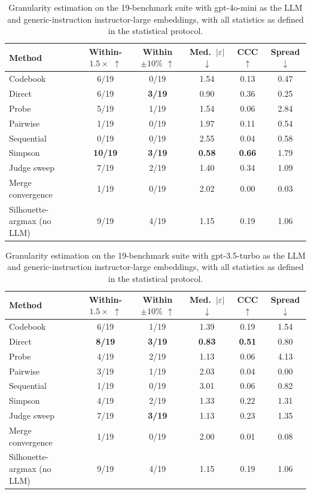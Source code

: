 \documentclass[11pt,a4paper,oneside]{report}
\begin{document}
\begin{table}[htbp]
\centering
\small
\begin{tabular}{lccccc}
\toprule
Method & Within-$1.5\times$ $\uparrow$ & Within $\pm10\%$ $\uparrow$ & Med.\ $|\varepsilon|$ $\downarrow$ & CCC $\uparrow$ & Spread $\downarrow$ \\
\midrule
Codebook & 6/19 & 0/19 & 1.54 & 0.13 & 0.47 \\
Direct & 6/19 & \textbf{3/19} & 0.90 & 0.36 & 0.25 \\
Probe & 5/19 & 1/19 & 1.54 & 0.06 & 2.84 \\
Pairwise & 1/19 & 0/19 & 1.97 & 0.11 & 0.54 \\
Sequential & 0/19 & 0/19 & 2.55 & 0.04 & 0.58 \\
Simpson & \textbf{10/19} & \textbf{3/19} & \textbf{0.58} & \textbf{0.66} & 1.79 \\
Judge sweep & 7/19 & 2/19 & 1.40 & 0.34 & 1.09 \\
Merge convergence & 1/19 & 0/19 & 2.02 & 0.00 & 0.03 \\
\midrule
Silhouette-argmax (no LLM) & 9/19 & 4/19 & 1.15 & 0.19 & 1.06 \\
\bottomrule
\end{tabular}
\caption[Granularity estimation scoreboard, gpt-4o-mini]{Granularity estimation on the
19-benchmark suite with {\small\ttfamily gpt-4o-mini} as the LLM and
generic-instruction {\small\ttfamily instructor-large} embeddings, with all
statistics as defined in the statistical protocol.}
\label{tab:rq2-scoreboard-gpt4omini}
\end{table}

\begin{table}[htbp]
\centering
\small
\begin{tabular}{lccccc}
\toprule
Method & Within-$1.5\times$ $\uparrow$ & Within $\pm10\%$ $\uparrow$ & Med.\ $|\varepsilon|$ $\downarrow$ & CCC $\uparrow$ & Spread $\downarrow$ \\
\midrule
Codebook & 6/19 & 1/19 & 1.39 & 0.19 & 1.54 \\
Direct & \textbf{8/19} & \textbf{3/19} & \textbf{0.83} & \textbf{0.51} & 0.80 \\
Probe & 4/19 & 2/19 & 1.13 & 0.06 & 4.13 \\
Pairwise & 3/19 & 1/19 & 2.03 & 0.04 & 0.00 \\
Sequential & 1/19 & 0/19 & 3.01 & 0.06 & 0.82 \\
Simpson & 4/19 & 2/19 & 1.33 & 0.22 & 1.31 \\
Judge sweep & 7/19 & \textbf{3/19} & 1.13 & 0.23 & 1.35 \\
Merge convergence & 1/19 & 0/19 & 2.00 & 0.01 & 0.08 \\
\midrule
Silhouette-argmax (no LLM) & 9/19 & 4/19 & 1.15 & 0.19 & 1.06 \\
\bottomrule
\end{tabular}
\caption[Granularity estimation scoreboard, gpt-3.5-turbo]{Granularity estimation on the
19-benchmark suite with {\small\ttfamily gpt-3.5-turbo} as the LLM and
generic-instruction {\small\ttfamily instructor-large} embeddings, with all
statistics as defined in the statistical protocol.}
\label{tab:rq2-scoreboard-gpt35}
\end{table}
\end{document}
